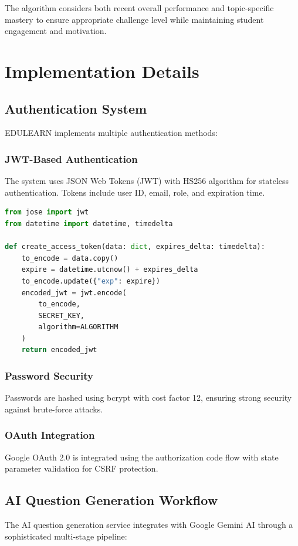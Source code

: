 \documentclass[conference]{IEEEtran}
\begin{document}
The algorithm considers both recent overall performance and topic-specific mastery to ensure appropriate challenge level while maintaining student engagement and motivation.

\section{Implementation Details}

\subsection{Authentication System}
EDULEARN implements multiple authentication methods:

\subsubsection{JWT-Based Authentication}
The system uses JSON Web Tokens (JWT) with HS256 algorithm for stateless authentication. Tokens include user ID, email, role, and expiration time.

\begin{lstlisting}[language=Python, caption=JWT Token Generation]
from jose import jwt
from datetime import datetime, timedelta

def create_access_token(data: dict, expires_delta: timedelta):
    to_encode = data.copy()
    expire = datetime.utcnow() + expires_delta
    to_encode.update({"exp": expire})
    encoded_jwt = jwt.encode(
        to_encode, 
        SECRET_KEY, 
        algorithm=ALGORITHM
    )
    return encoded_jwt
\end{lstlisting}

\subsubsection{Password Security}
Passwords are hashed using bcrypt with cost factor 12, ensuring strong security against brute-force attacks.

\subsubsection{OAuth Integration}
Google OAuth 2.0 is integrated using the authorization code flow with state parameter validation for CSRF protection.

\subsection{AI Question Generation Workflow}
The AI question generation service integrates with Google Gemini AI through a sophisticated multi-stage pipeline:
\end{document}
